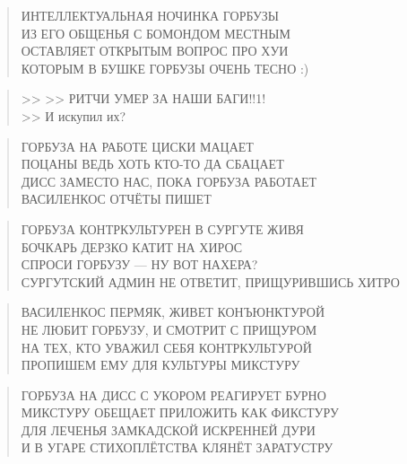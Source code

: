 \poemtitle{***}
\begin{verse}
ИНТЕЛЛЕКТУАЛЬНАЯ НОЧИНКА ГОРБУЗЫ\\
ИЗ ЕГО ОБЩЕНЬЯ С БОМОНДОМ МЕСТНЫМ\\
ОСТАВЛЯЕТ ОТКРЫТЫМ ВОПРОС ПРО ХУИ\\
КОТОРЫМ В БУШКЕ ГОРБУЗЫ ОЧЕНЬ ТЕСНО :)
\end{verse}

\poemtitle{***}
\begin{verse}
>> >> РИТЧИ УМЕР ЗА НАШИ БАГИ!!1!\\
>> И искупил их?
\end{verse}

\poemtitle{***}
\begin{verse}
ГОРБУЗА НА РАБОТЕ ЦИСКИ МАЦАЕТ\\
ПОЦАНЫ ВЕДЬ ХОТЬ КТО-ТО ДА СБАЦАЕТ\\
ДИСС ЗАМЕСТО НАС, ПОКА ГОРБУЗА РАБОТАЕТ\\
ВАСИЛЕНКОС ОТЧЁТЫ ПИШЕТ
\end{verse}

\poemtitle{***}
\begin{verse}
ГОРБУЗА КОНТРКУЛЬТУРЕН В СУРГУТЕ ЖИВЯ\\
БОЧКАРЬ ДЕРЗКО КАТИТ НА ХИРОС\\
СПРОСИ ГОРБУЗУ — НУ ВОТ НАХЕРА?\\
СУРГУТСКИЙ АДМИН НЕ ОТВЕТИТ, ПРИЩУРИВШИСЬ ХИТРО
\end{verse}

\poemtitle{***}
\begin{verse}
ВАСИЛЕНКОС ПЕРМЯК, ЖИВЕТ КОНЪЮНКТУРОЙ\\
НЕ ЛЮБИТ ГОРБУЗУ, И СМОТРИТ С ПРИЩУРОМ\\
НА ТЕХ, КТО УВАЖИЛ СЕБЯ КОНТРКУЛЬТУРОЙ\\
ПРОПИШЕМ ЕМУ ДЛЯ КУЛЬТУРЫ МИКСТУРУ
\end{verse}

\poemtitle{***}
\begin{verse}
ГОРБУЗА НА ДИСС С УКОРОМ РЕАГИРУЕТ БУРНО\\
МИКСТУРУ ОБЕЩАЕТ ПРИЛОЖИТЬ КАК ФИКСТУРУ\\
ДЛЯ ЛЕЧЕНЬЯ ЗАМКАДСКОЙ ИСКРЕННЕЙ ДУРИ\\
И В УГАРЕ СТИХОПЛЁТСТВА КЛЯНЁТ ЗАРАТУСТРУ
\end{verse}

